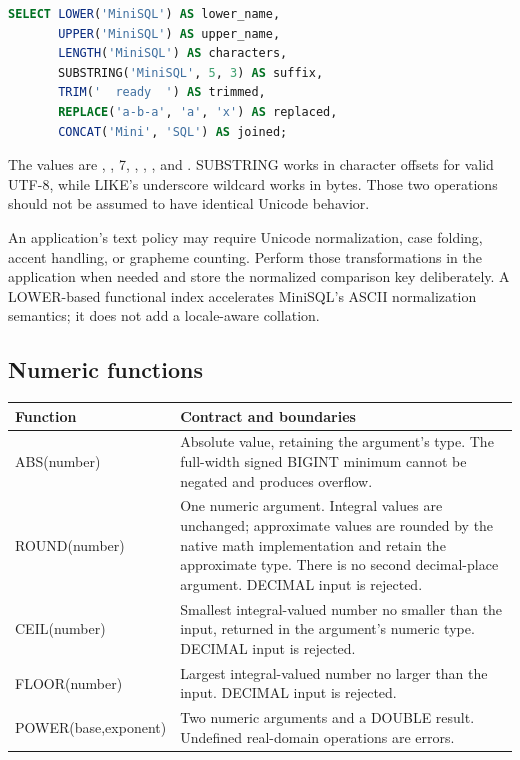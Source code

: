 \begin{lstlisting}[language=SQL]
SELECT LOWER('MiniSQL') AS lower_name,
       UPPER('MiniSQL') AS upper_name,
       LENGTH('MiniSQL') AS characters,
       SUBSTRING('MiniSQL', 5, 3) AS suffix,
       TRIM('  ready  ') AS trimmed,
       REPLACE('a-b-a', 'a', 'x') AS replaced,
       CONCAT('Mini', 'SQL') AS joined;
\end{lstlisting}

The values are , , 7, , , , and . SUBSTRING works in character offsets for valid UTF-8, while LIKE's underscore wildcard works in bytes. Those two operations should not be assumed to have identical Unicode behavior.

An application's text policy may require Unicode normalization, case folding, accent handling, or grapheme counting. Perform those transformations in the application when needed and store the normalized comparison key deliberately. A LOWER-based functional index accelerates MiniSQL's ASCII normalization semantics; it does not add a locale-aware collation.

\subsection{Numeric functions}

\begin{longtable}{p{.30\linewidth}p{.63\linewidth}}
\toprule
Function & Contract and boundaries \\
\midrule
\endhead
ABS(number) & Absolute value, retaining the argument's type. The full-width signed BIGINT minimum cannot be negated and produces overflow. \\
ROUND(number) & One numeric argument. Integral values are unchanged; approximate values are rounded by the native math implementation and retain the approximate type. There is no second decimal-place argument. DECIMAL input is rejected. \\
CEIL(number) & Smallest integral-valued number no smaller than the input, returned in the argument's numeric type. DECIMAL input is rejected. \\
FLOOR(number) & Largest integral-valued number no larger than the input. DECIMAL input is rejected. \\
POWER(base,exponent) & Two numeric arguments and a DOUBLE result. Undefined real-domain operations are errors. \\
\bottomrule
\end{longtable}

